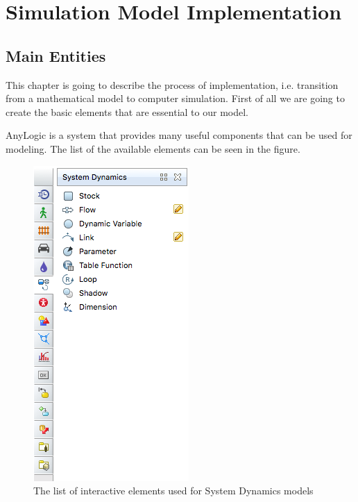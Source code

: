 \chapter{Simulation Model Implementation}


\section{Main Entities}

This chapter is going to describe the process of implementation, i.e. transition from a mathematical model to computer simulation. First of all we are going to create the basic elements that are essential to our model.


AnyLogic is a system that provides many useful components that can be used for modeling. The list of the available elements can be seen in the figure.

\begin{figure}[!ht]
  \centering
  \includegraphics[height=0.5\textwidth]{img/screens/basic/basic22}
  \caption{The list of interactive elements used for System Dynamics models}
\end{figure}

